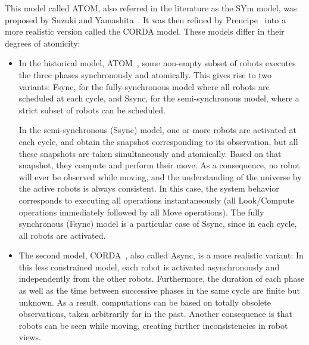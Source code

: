 This model called ATOM, also referred  in the literature as the SYm model, was proposed by Suzuki and Yamashita~\cite{suzuki_distributed_1999}.
 It was then refined by Prencipe~\cite{prencipe_new_2000} into a more realistic version called the CORDA model. 
 These models differ in their degrees of atomicity: 
\begin{itemize}%
\item In the historical model, ATOM~\cite{suzuki_distributed_1999}, some non-empty subset of robots executes the three phases synchronously and atomically. This gives rise to two variants: Fsync, for the fully-synchronous model where all robots are scheduled at each cycle, and Ssync, for the semi-synchronous model, where a strict subset of robots can be scheduled. 

In the semi-synchronous (Ssync) model, one or more robots are activated at each cycle, and obtain the snapshot corresponding to its observation, but all these snapshots are taken simultaneously and atomically. Based on that snapshot, they compute and perform their move. As a consequence, no robot will ever be observed while moving, and the understanding of the universe by the active robots is always consistent. In this case, the system behavior corresponds to executing all operations instantaneously (all Look/Compute operations immediately followed by all Move operations). 
The fully synchronous (Fsync) model is a particular case of Ssync, since in each cycle, all robots are activated. 
\item
The second model, CORDA~\cite{prencipe_new_2000},  also called Async, is a more realistic variant: In this less constrained model, each robot is activated asynchronously and independently from the other robots. Furthermore, the duration of each phase as well as the time between successive phases in the same cycle are finite but unknown. As a result, computations can be based on totally obsolete observations, taken arbitrarily far in the past. Another consequence is that robots can be seen while moving, creating further inconsistencies in robot views. 
\end{itemize}

